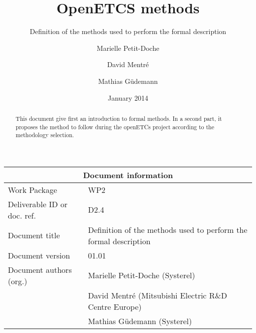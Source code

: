 \documentclass{template/openetcs_article}
\begin{document}
\frontmatter
{}






\title{OpenETCS methods}

\subtitle{ Definition of the methods used to perform the formal description}

\date{January 2014}


\author{Marielle Petit-Doche}


\author{David Mentré}

\author{Mathias Güdemann}


 


\begin{abstract}
This document give first an introduction to formal  methods.
In a second part, it proposes the method to  follow during the openETCs project according to the methodology selection.

\end{abstract}

\maketitle
\tableofcontents
\listoffiguresandtables
\newpage

\begin{tabular}{|p{4.4cm}|p{8.7cm}|}
\hline
\multicolumn{2}{|c|}{Document information} \\
\hline
Work Package &  WP2  \\
Deliverable ID or doc. ref. & D2.4\\
\hline
Document title & Definition of the methods used to perform the formal description \\
Document version & 01.01 \\
Document authors (org.)  & Marielle Petit-Doche (Systerel)  \\
  & David Mentré (Mitsubishi Electric R\&D Centre Europe)  \\
  & Mathias Güdemann (Systerel)  \\
\hline
\end{tabular}
\end{document}
